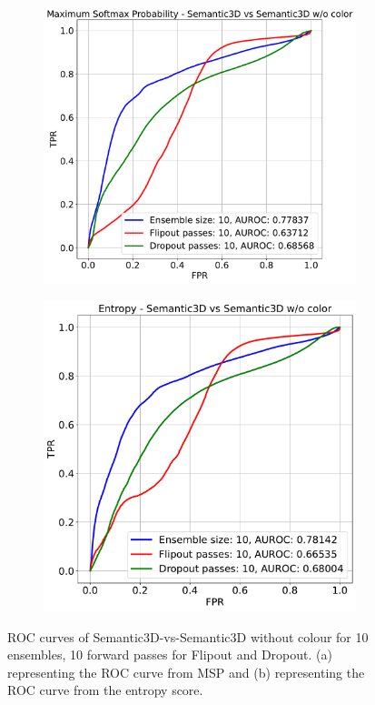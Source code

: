     \begin{figure}[h!]
        \begin{subfigure}{0.49\textwidth}
            \includegraphics[scale=0.34]{images/AUROC/MSP_cnc_10.pdf}
            \caption{}
            \label{fig:roc_msp_10_ood_2}
        \end{subfigure}
        \begin{subfigure}{0.495\textwidth}
            \includegraphics[scale=0.34]{images/AUROC/Entropy_cnc_10.pdf}
            \caption{}
            \label{fig:roc_ent_10_ood_2}
        \end{subfigure}
        \caption{ROC curves of Semantic3D-vs-Semantic3D without colour for 10 ensembles, 10 forward passes for Flipout and Dropout. (a) representing the ROC curve from MSP and (b) representing the ROC curve from the entropy score.}
    \end{figure}
